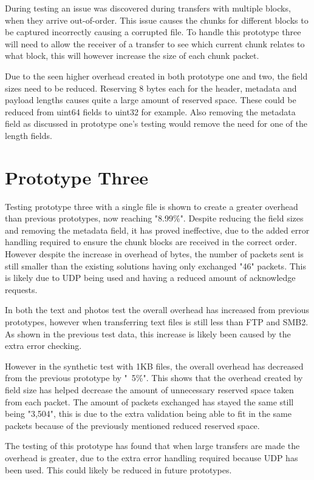 During testing an issue was discovered during transfers with multiple blocks, when they arrive out-of-order. This issue causes the chunks for different blocks to be captured incorrectly causing a corrupted file. To handle this prototype three will need to allow the receiver of a transfer to see which current chunk relates to what block, this will however increase the size of each chunk packet.

Due to the seen higher overhead created in both prototype one and two, the field sizes need to be reduced. Reserving 8 bytes each for the header, metadata and payload lengths causes quite a large amount of reserved space. These could be reduced from uint64 fields to uint32 for example. Also removing the metadata field as discussed in prototype one's testing would remove the need for one of the length fields.


\section{Prototype Three}
Testing prototype three with a single file is shown to create a greater overhead than previous prototypes, now reaching "8.99\%". Despite reducing the field sizes and removing the metadata field, it has proved ineffective, due to the added error handling required to ensure the chunk blocks are received in the correct order. However despite the increase in overhead of bytes, the number of packets sent is still smaller than the existing solutions having only exchanged "46" packets. This is likely due to UDP being used and having a reduced amount of acknowledge requests.

In both the text and photos test the overall overhead has increased from previous prototypes, however when transferring text files is still less than FTP and SMB2. As shown in the previous test data, this increase is likely been caused by the extra error checking.

However in the synthetic test with 1KB files, the overall overhead has decreased from the previous prototype by "~5\%". This shows that the overhead created by field size has helped decrease the amount of unnecessary reserved space taken from each packet. The amount of packets exchanged has stayed the same still being "3,504", this is due to the extra validation being able to fit in the same packets because of the previously mentioned reduced reserved space.

The testing of this prototype has found that when large transfers are made the overhead is greater, due to the extra error handling required because UDP has been used. This could likely be reduced in future prototypes.

